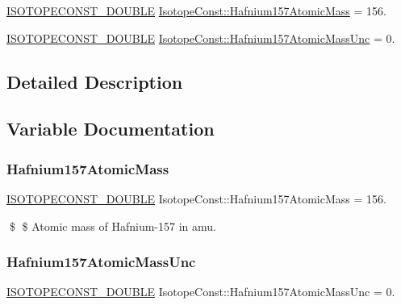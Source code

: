 \begin{DoxyCompactItemize}
\item 
\mbox{\hyperlink{group___isotope_const-_macros_ga8f45a7272ce02c0b4c65c44636ed719a}{I\+S\+O\+T\+O\+P\+E\+C\+O\+N\+S\+T\+\_\+\+D\+O\+U\+B\+LE}} \mbox{\hyperlink{group___isotope_const-_hafnium-_hf157_gadfb3f33ba1af28f53ac6a52895343727}{Isotope\+Const\+::\+Hafnium157\+Atomic\+Mass}} = 156.
\item 
\mbox{\hyperlink{group___isotope_const-_macros_ga8f45a7272ce02c0b4c65c44636ed719a}{I\+S\+O\+T\+O\+P\+E\+C\+O\+N\+S\+T\+\_\+\+D\+O\+U\+B\+LE}} \mbox{\hyperlink{group___isotope_const-_hafnium-_hf157_ga8bdf4a6983d775139e5c20de703bb35c}{Isotope\+Const\+::\+Hafnium157\+Atomic\+Mass\+Unc}} = 0.
\end{DoxyCompactItemize}


\subsection{Detailed Description}


\subsection{Variable Documentation}
\mbox{\label{group___isotope_const-_hafnium-_hf157_gadfb3f33ba1af28f53ac6a52895343727}} 
\subsubsection{\texorpdfstring{Hafnium157\+Atomic\+Mass}{Hafnium157AtomicMass}}
{\footnotesize\ttfamily \mbox{\hyperlink{group___isotope_const-_macros_ga8f45a7272ce02c0b4c65c44636ed719a}{I\+S\+O\+T\+O\+P\+E\+C\+O\+N\+S\+T\+\_\+\+D\+O\+U\+B\+LE}} Isotope\+Const\+::\+Hafnium157\+Atomic\+Mass = 156.}

\$ \$ Atomic mass of Hafnium-\/157 in amu. \mbox{\label{group___isotope_const-_hafnium-_hf157_ga8bdf4a6983d775139e5c20de703bb35c}} 
\subsubsection{\texorpdfstring{Hafnium157\+Atomic\+Mass\+Unc}{Hafnium157AtomicMassUnc}}
{\footnotesize\ttfamily \mbox{\hyperlink{group___isotope_const-_macros_ga8f45a7272ce02c0b4c65c44636ed719a}{I\+S\+O\+T\+O\+P\+E\+C\+O\+N\+S\+T\+\_\+\+D\+O\+U\+B\+LE}} Isotope\+Const\+::\+Hafnium157\+Atomic\+Mass\+Unc = 0.}

